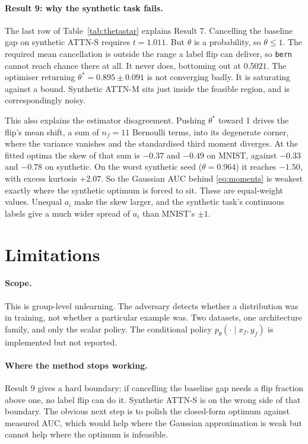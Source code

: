 \documentclass[11pt,a4paper]{article}
\begin{document}
\paragraph{Result 9: why the synthetic task fails.} The last row of
Table~\ref{tab:thetastar} explains Result 7. Cancelling the baseline gap on
synthetic ATTN-S requires $t=1.011$. But $\theta$ is a probability, so
$\theta\le1$. The required mean cancellation is outside the range a label flip
can deliver, so \texttt{bern} cannot reach chance there at all. It never does,
bottoming out at $0.5021$. The optimiser returning $\theta^*=0.895\pm0.091$ is
not converging badly. It is saturating against a bound. Synthetic ATTN-M sits
just inside the feasible region, and is correspondingly noisy.

This also explains the estimator disagreement. Pushing $\theta^*$ toward 1
drives the flip's mean shift, a sum of $n_f=11$ Bernoulli terms, into its
degenerate corner, where the variance vanishes and the standardised third
moment diverges. At the fitted optima the skew of that sum is $-0.37$ and
$-0.49$ on MNIST, against $-0.33$ and $-0.78$ on synthetic. On the worst
synthetic seed ($\theta=0.964$) it reaches $-1.50$, with excess kurtosis
$+2.07$. So the Gaussian AUC behind \eqref{eq:moments} is weakest exactly where
the synthetic optimum is forced to sit. These are equal-weight values. Unequal
$a_i$ make the skew larger, and the synthetic task's continuous labels give a
much wider spread of $a_i$ than MNIST's $\pm1$.

\section{Limitations}

\paragraph{Scope.} This is group-level unlearning. The adversary detects
whether a distribution was in training, not whether a particular example was.
Two datasets, one architecture family, and only the scalar policy. The
conditional policy $p_\theta(\cdot\mid x_f,y_f)$ is implemented but not
reported.

\paragraph{Where the method stops working.} Result 9 gives a hard boundary: if
cancelling the baseline gap needs a flip fraction above one, no label flip can
do it. Synthetic ATTN-S is on the wrong side of that boundary. The obvious
next step is to polish the closed-form optimum against measured AUC, which
would help where the Gaussian approximation is weak but cannot help where the
optimum is infeasible.
\end{document}
